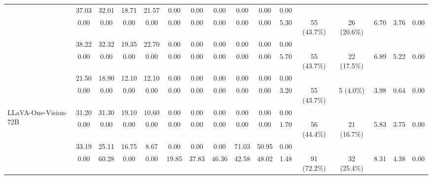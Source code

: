 \documentclass[letterpaper]{article} %
\begin{document}
\begin{table*}[t!]
\begin{tabular}{p{2cm} cccccccccc cc ccc}
\rowcolor{bg-tb-light-video} & 37.03 & 32.01 & 18.71 & 21.57 & 0.00 & 0.00 & 0.00 & 0.00 & 0.00 &0.00 &  &  &  &  &  \\
\rowcolor{bg-tb-light-video} \multirow{-2}{*}{ InternVL-2.5-26B} & 0.00 & 0.00 & 0.00 & 0.00 & 0.00 & 0.00 & 0.00 & 0.00 & 0.00 & 5.30 & \multirow{-2}{*}{55 (43.7\%)} & \multirow{-2}{*}{26 (20.6\%)} & \multirow{-2}{*}{6.70} & \multirow{-2}{*}{3.76} & \multirow{-2}{*}{0.00} \\

\addlinespace[4pt]

\multirow{2}{*}{ Qwen2-VL-72B} & 38.22 & 32.32 & 19.35 & 22.70 & 0.00 & 0.00 & 0.00 & 0.00 & 0.00 &0.00 &  &  &  &  &  \\
& 0.00 & 0.00 & 0.00 & 0.00 & 0.00 & 0.00 & 0.00 & 0.00 & 0.00 & 5.70 & \multirow{-2}{*}{55 (43.7\%)} & \multirow{-2}{*}{22 (17.5\%)} & \multirow{-2}{*}{6.89} & \multirow{-2}{*}{5.22} & \multirow{-2}{*}{0.00} \\

\addlinespace[4pt]

\rowcolor{bg-tb-light-video} & 21.50 & 18.90 & 12.10 & 12.10 & 0.00 & 0.00 & 0.00 & 0.00 & 0.00 &0.00 &  &  &  &  &  \\
\rowcolor{bg-tb-light-video} \multirow{-2}{*}{ DeepSeek-VL-2} & 0.00 & 0.00 & 0.00 & 0.00 & 0.00 & 0.00 & 0.00 & 0.00 & 0.00 & 3.20 & \multirow{-2}{*}{55 (43.7\%)} & \multirow{-2}{*}{5 (4.0\%)} & \multirow{-2}{*}{3.98} & \multirow{-2}{*}{0.64} & \multirow{-2}{*}{0.00} \\



\multirow{2}{*}{\parbox{2cm}{LLaVA-One-Vision-72B}} & 31.20 & 31.30 & 19.10 & 10.60 & 0.00 & 0.00 & 0.00 & 0.00 & 0.00 &0.00 &  &  &  &  &  \\
& 0.00 & 0.00 & 0.00 & 0.00 & 0.00 & 0.00 & 0.00 & 0.00 & 0.00 & 1.70 & \multirow{-2}{*}{56 (44.4\%)} & \multirow{-2}{*}{21 (16.7\%)} & \multirow{-2}{*}{5.83} & \multirow{-2}{*}{3.75} & \multirow{-2}{*}{0.00} \\

\addlinespace[4pt]

\rowcolor{bg-tb-light-video}  & 33.19 & 25.11 & 16.75 & 8.67 & 0.00 & 0.00 & 0.00 & 71.03 & 50.95 &0.00 &  &  &  &  &  \\
\rowcolor{bg-tb-light-video} \multirow{-2}{*}{ Sa2VA-8B} & 0.00 & 60.28 & 0.00 & 0.00 & 19.85 & 37.83 & 46.36 & 42.58 & 48.02 & 1.48 & \multirow{-2}{*}{91 (72.2\%)} & \multirow{-2}{*}{32 (25.4\%)} & \multirow{-2}{*}{8.31} & \multirow{-2}{*}{4.38} & \multirow{-2}{*}{0.00} \\


\end{tabular}
\end{table*}
\end{document}
